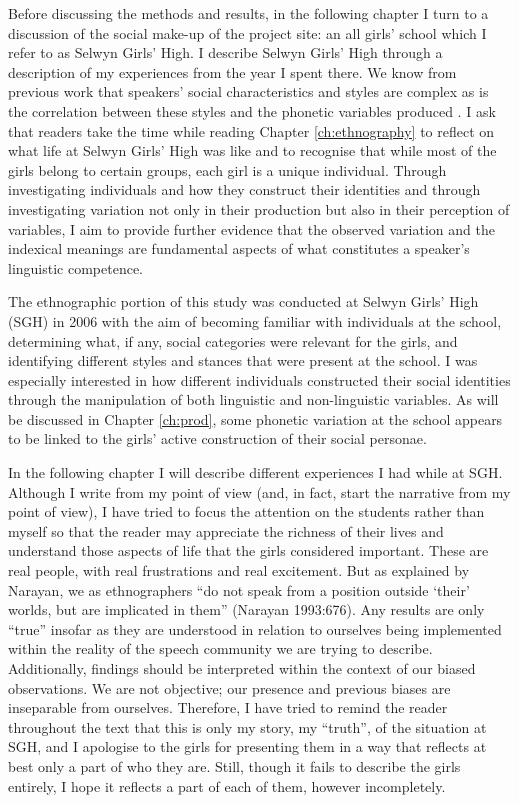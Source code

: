 Before discussing the methods and results, in the following chapter I turn to a discussion of the social make-up of the project site: an all girls' school which I refer to as Selwyn Girls' High.  I describe Selwyn Girls' High through a description of my experiences from the year I spent there.  We know from previous work that speakers' social characteristics and styles are complex as is the correlation between these styles and the phonetic variables produced \cite{eckert2005,eckert1996nailpolish,mendozadenton2008,zhang2005}.  I ask that readers take the time while reading Chapter \ref{ch:ethnography} to reflect on what life at Selwyn Girls' High was like and to recognise that while most of the girls belong to certain groups, each girl is a unique individual.  Through investigating individuals and how they construct their identities and through investigating variation not only in their production but also in their perception of variables, I aim to provide further evidence that the observed variation and the indexical meanings are fundamental aspects of what constitutes a speaker's linguistic competence.

The ethnographic portion of this study was conducted at Selwyn Girls' High (SGH) in 2006 with the aim of becoming familiar with individuals at the school, determining what, if any, social categories were relevant for the girls, and identifying different styles and stances that were present at the school.  I was especially interested in how different individuals constructed their social identities through the manipulation of both linguistic and non-linguistic variables.  As will be discussed in Chapter \ref{ch:prod}, some phonetic variation at the school appears to be linked to the girls' active construction of their social personae.  

In the following chapter I will describe different experiences I had while at SGH.  Although I write from my point of view (and, in fact, start the narrative from my point of view), I have tried to focus the attention on the students rather than myself so that the reader may appreciate the richness of their lives and understand those aspects of life that the girls considered important.  These are real people, with real frustrations and real excitement.  But as explained by Narayan, we as ethnographers ``do not speak from a position outside `their' worlds, but are implicated in them'' (Narayan 1993:676).  Any results are only ``true'' insofar as they are understood in relation to ourselves being implemented within the reality of the speech community we are trying to describe.  Additionally, findings should be interpreted within the context of our biased observations.  We are not objective; our presence and previous biases are inseparable from ourselves.  Therefore, I have tried to remind the reader throughout the text that this is only my story, my ``truth'', of the situation at SGH, and I apologise to the girls for presenting them in a way that reflects at best only a part of who they are.  Still, though it fails to describe the girls entirely, I hope it reflects a part of each of them, however incompletely.

